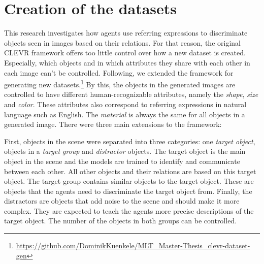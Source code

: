 \section{Creation of the datasets}
\label{sec:creation-dataset}
This research investigates how agents use referring expressions to discriminate objects seen in images based on their relations.
For that reason, the original CLEVR framework offers too little control over how a new dataset is created.
Especially, which objects and in which attributes they share with each other in each image can't be controlled.
Following, we extended the framework for generating new datasets.\footnote{\href{https://github.com/DominikKuenkele/MLT\_Master-Thesis\_clevr-dataset-gen}{https://github.com/DominikKuenkele/MLT\_Master-Thesis\_clevr-dataset-gen}}
By this, the objects in the generated images are controlled to have different human-recognizable attributes, namely the \emph{shape}, \emph{size} and \emph{color}.
These attributes also correspond to referring expressions in natural language such as English.
The \emph{material} is always the same for all objects in a generated image.
There were three main extensions to the framework:

First, objects in the scene were separated into three categories: one \emph{target object}, objects in a \emph{target group} and \emph{distractor} objects.
The target object is the main object in the scene and the models are trained to identify and communicate between each other.
All other objects and their relations are based on this target object.
The target group contains similar objects to the target object.
These are objects that the agents need to discriminate the target object from.
Finally, the distractors are objects that add noise to the scene and should make it more complex. They are expected to teach the agents more precise descriptions of the target object.
The number of the objects in both groups can be controlled.

